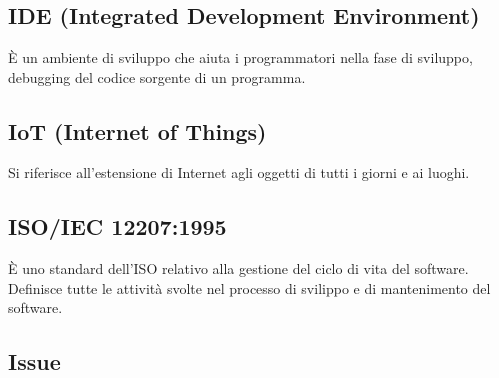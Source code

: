 \section{}
\subsection*{IDE (Integrated Development Environment)} È un ambiente di sviluppo che aiuta i programmatori nella fase di sviluppo, debugging del codice sorgente di un programma.

\subsection*{IoT (Internet of Things)} Si riferisce all'estensione di Internet agli oggetti di tutti i giorni e ai luoghi.

\subsection*{ISO/IEC 12207:1995} È uno standard dell'ISO relativo alla gestione del ciclo di vita del software. Definisce tutte le attività svolte nel processo di svilippo e di mantenimento del software.

\subsection*{Issue} 

